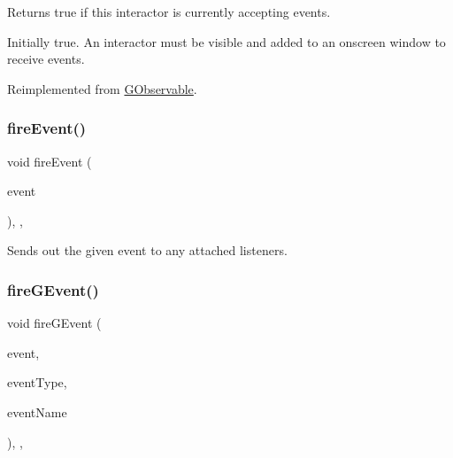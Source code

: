 Returns true if this interactor is currently accepting events. 

Initially true. An interactor must be visible and added to an onscreen window to receive events. 

Reimplemented from \mbox{\hyperlink{classGObservable_a8ebb3da91032e7f4c34485dabc518b8a}{G\+Observable}}.

\mbox{\label{classGObservable_a63e5e5a6227c59c928493b11aceb0f67}} 
\subsubsection{\texorpdfstring{fire\+Event()}{fireEvent()}}
{\footnotesize\ttfamily void fire\+Event (\begin{DoxyParamCaption}\item[{\mbox{\hyperlink{classGEvent}{G\+Event}} \&}]{event }\end{DoxyParamCaption})\hspace{0.3cm}{\ttfamily [protected]}, {\ttfamily [virtual]}, {\ttfamily [inherited]}}



Sends out the given event to any attached listeners. 

\mbox{\label{classGObservable_ab3983ea07337b52020a29cc00c653d8d}} 
\subsubsection{\texorpdfstring{fire\+G\+Event()}{fireGEvent()}\hspace{0.1cm}{\footnotesize\ttfamily [1/8]}}
{\footnotesize\ttfamily void fire\+G\+Event (\begin{DoxyParamCaption}\item[{Q\+Event $\ast$}]{event,  }\item[{Event\+Type}]{event\+Type,  }\item[{const std\+::string \&}]{event\+Name }\end{DoxyParamCaption})\hspace{0.3cm}{\ttfamily [protected]}, {\ttfamily [virtual]}, {\ttfamily [inherited]}}



